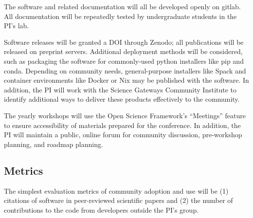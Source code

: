 The software and related documentation will all be developed openly on gitlab.  All documentation will be repeatedly tested by undergraduate students in the PI's lab.

Software releases will be granted a DOI through Zenodo; all publications will be released on preprint servers.  Additional deployment methods will be considered, such as packaging the software for commonly-used python installers like pip and conda.  Depending on community needs, general-purpose installers like Spack \cite{spack} and container environments like Docker \cite{ssi-docker, docker} or Nix \cite{nix-hpc, nix} may be published with the software.  In addition, the PI will work with the Science Gateways Community Institute to identify additional ways to deliver these products effectively to the community.

The yearly workshops will use the Open Science Framework's ``Meetings'' feature to ensure accessibility of materials prepared for the conference.  In addition, the PI will maintain a public, online forum for community discussion, pre-workshop planning, and roadmap planning.


\subsection{Metrics}
The simplest evaluation metrics of community adoption and use will be (1) citations of software in peer-reviewed scientific papers and (2) the number of contributions to the code from developers outside the PI's group.

